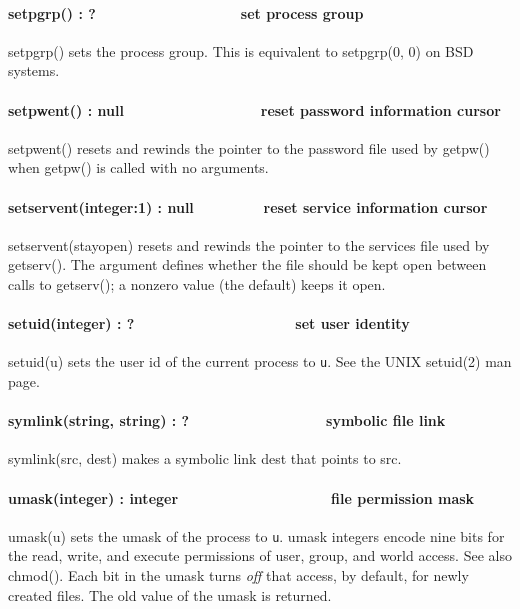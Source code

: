\paragraph[setpgrp() : ?\ \ \ \ \ \ \ \ \ \ \ \ \ \ \ \  \ \ set process
group]{setpgrp() : ?\ \ \ \ \ \ \ \ \ \ \ \ \ \ \ \  \ \ set process
group}
setpgrp() sets the process group. This is equivalent to setpgrp(0, 0) on
BSD systems. 

\paragraph[setpwent() : null\ \ \ \ \ \ \ \  \ \ \ \ \ \ \ \ \ reset
password information cursor]{setpwent() : null\ \ \ \ \ \ \ \ 
\ \ \ \ \ \ \ \ \ reset password information cursor}
setpwent() resets and rewinds the pointer to the password file used by
getpw() when getpw() is called with no arguments.

\paragraph[setservent(integer:1) : null \ \ \ \ \ \  \ \ reset service
information cursor]{setservent(integer:1) : null \ \ \ \ \ \  \ \ reset
service information cursor}
setservent(stayopen) resets and rewinds the pointer to the services file
used by getserv(). The argument defines whether the file should be kept
open between calls to getserv(); a nonzero value (the default) keeps it
open. 

\paragraph[setuid(integer) : ?\ \ \ \ \ \ \ \ \ \ \ \ \ \ 
\ \ \ \ \ \ set user identity]{setuid(integer) :
?\ \ \ \ \ \ \ \ \ \ \ \ \ \  \ \ \ \ \ \ set user identity}
setuid(u) sets the user id of the current process to \texttt{u}. See the
UNIX setuid(2) man page. 

\paragraph[symlink(string, string) : ?\ \ \ \ \ \ \ \ \ \ \ \ 
\ \ \ \ \ symbolic file link]{symlink(string, string) :
?\ \ \ \ \ \ \ \ \ \ \ \  \ \ \ \ \ symbolic file link}
\index{link!symbolic file}symlink(src, dest) makes a symbolic link dest
that points to src.

\paragraph[umask(integer) : integer\ \ \ \ \ \ \ \ \ \ 
\ \ \ \ \ \ \ \ \ file permission mask]{umask(integer) :
integer\ \ \ \ \ \ \ \ \ \  \ \ \ \ \ \ \ \ \ file permission mask}
umask(u) sets the umask of the process to \texttt{u}. umask integers
encode nine bits for the read, write, and execute permissions of user,
group, and world access. See also chmod(). Each bit in the umask turns
\textit{off} that access, by default, for newly created files. The old
value of the umask is returned.

